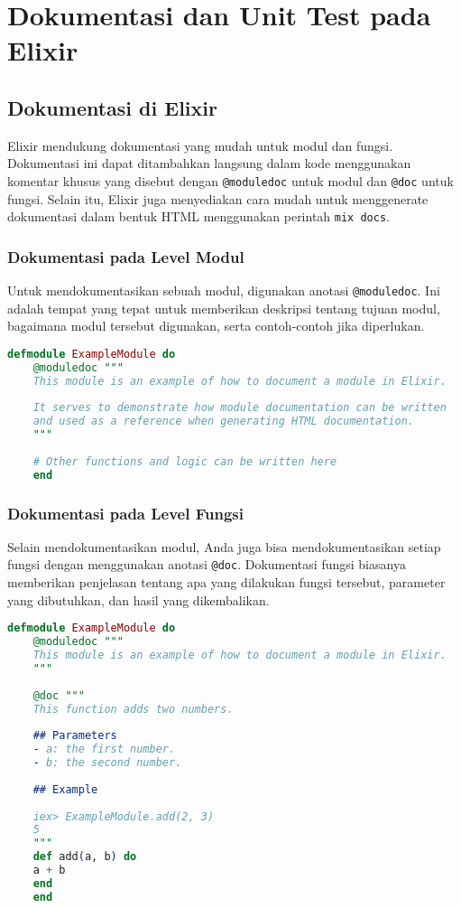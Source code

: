 \chapter{Dokumentasi dan Unit Test pada Elixir}


\section{Dokumentasi di Elixir}

Elixir mendukung dokumentasi yang mudah untuk modul dan fungsi. Dokumentasi ini dapat ditambahkan langsung dalam kode menggunakan komentar khusus yang disebut dengan \texttt{@moduledoc} untuk modul dan \texttt{@doc} untuk fungsi. Selain itu, Elixir juga menyediakan cara mudah untuk menggenerate dokumentasi dalam bentuk HTML menggunakan perintah \texttt{mix docs}.

\subsection{Dokumentasi pada Level Modul}

Untuk mendokumentasikan sebuah modul, digunakan anotasi \texttt{@moduledoc}. Ini adalah tempat yang tepat untuk memberikan deskripsi tentang tujuan modul, bagaimana modul tersebut digunakan, serta contoh-contoh jika diperlukan.

\begin{lstlisting}[language=Elixir]
	defmodule ExampleModule do
	@moduledoc """
	This module is an example of how to document a module in Elixir.
	
	It serves to demonstrate how module documentation can be written
	and used as a reference when generating HTML documentation.
	"""
	
	# Other functions and logic can be written here
	end
\end{lstlisting}

\subsection{Dokumentasi pada Level Fungsi}

Selain mendokumentasikan modul, Anda juga bisa mendokumentasikan setiap fungsi dengan menggunakan anotasi \texttt{@doc}. Dokumentasi fungsi biasanya memberikan penjelasan tentang apa yang dilakukan fungsi tersebut, parameter yang dibutuhkan, dan hasil yang dikembalikan.

\begin{lstlisting}[language=Elixir]
	defmodule ExampleModule do
	@moduledoc """
	This module is an example of how to document a module in Elixir.
	"""
	
	@doc """
	This function adds two numbers.
	
	## Parameters
	- a: the first number.
	- b: the second number.
	
	## Example
	
	iex> ExampleModule.add(2, 3)
	5
	"""
	def add(a, b) do
	a + b
	end
	end
\end{lstlisting}

